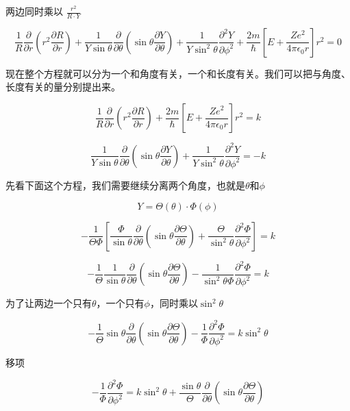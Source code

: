 \documentclass[a4paper]{ctexrep}
\begin{document}
    两边同时乘以 $\frac{r^2}{R \cdot Y}$

    \[
        \frac{1}{R} \frac{\partial}{\partial r} \left( r^2 \frac{\partial R}{\partial r} \right) + \frac{1}{Y \sin \theta} \frac{\partial }{\partial \theta} \left( \sin \theta \frac{\partial Y}{\partial \theta} \right) + \frac{1}{Y \sin ^2 \theta} \frac{\partial ^2 Y}{\partial \phi ^2} + \frac{2m}{\hbar}\left[ E + \frac{Ze^2}{4\pi \epsilon_0 r }  \right] r^2 = 0 
    \]

    现在整个方程就可以分为一个和角度有关，一个和长度有关。我们可以把与角度、长度有关的量分别提出来。

    \[
        \frac{1}{R} \frac{\partial}{\partial r} \left( r^2 \frac{\partial R}{\partial r} \right) + \frac{2m}{\hbar}\left[ E + \frac{Ze^2}{4\pi \epsilon_0 r }  \right] r^2 = k
    \]

    \[
        \frac{1}{Y \sin \theta} \frac{\partial}{\partial \theta} \left( \sin \theta \frac{\partial Y}{\partial \theta} \right) + \frac{1}{Y \sin ^2 \theta} \frac{\partial ^2 Y}{\partial \phi ^2} = -k 
    \]

    先看下面这个方程，我们需要继续分离两个角度，也就是$\theta$和$\phi$

    \[
        Y = \Theta(\theta) \cdot \Phi(\phi)  
    \]

    \[
        - \frac{1}{\Theta \Phi} \left[ \frac{\Phi}{ \sin \theta} \frac{\partial}{\partial \theta} \left( \sin \theta \frac{\partial \Theta}{\partial \theta} \right) + \frac{\Theta}{ \sin ^2 \theta} \frac{\partial ^2 \Phi}{\partial \phi ^2} \right] = k
    \]

    \[
        - \frac{1}{\Theta} \frac{1}{ \sin \theta} \frac{\partial}{\partial \theta} \left( \sin \theta \frac{\partial \Theta}{\partial \theta} \right) - \frac{1}{ \sin ^2 \theta \Phi} \frac{\partial ^2 \Phi}{\partial \phi ^2} = k
    \]

    为了让两边一个只有$\theta$，一个只有$\phi$，同时乘以$\sin ^2   \theta$

    \[
        - \frac{1}{\Theta}  \sin \theta \frac{\partial}{\partial \theta} \left( \sin \theta \frac{\partial \Theta}{\partial \theta} \right) - \frac{1}{\Phi} \frac{\partial ^2 \Phi}{\partial \phi ^2} = k \sin ^2 \theta
    \]

    移项

    \[
        -\frac{1}{\Phi} \frac{\partial ^2 \Phi}{\partial \phi ^2} = k \sin ^2 \theta  + \frac{\sin \theta}{\Theta}   \frac{\partial}{\partial \theta} \left( \sin \theta \frac{\partial \Theta}{\partial \theta} \right)
    \]
\end{document}
